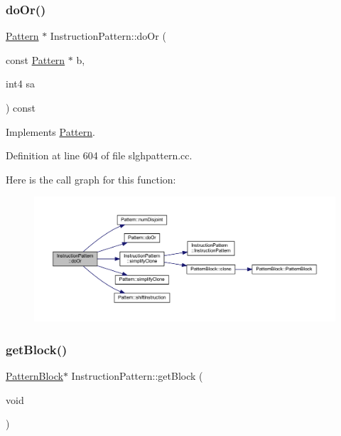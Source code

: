 \subsubsection{\texorpdfstring{doOr()}{doOr()}}
{\footnotesize\ttfamily \mbox{\hyperlink{class_pattern}{Pattern}} $\ast$ Instruction\+Pattern\+::do\+Or (\begin{DoxyParamCaption}\item[{const \mbox{\hyperlink{class_pattern}{Pattern}} $\ast$}]{b,  }\item[{int4}]{sa }\end{DoxyParamCaption}) const\hspace{0.3cm}{\ttfamily [virtual]}}



Implements \mbox{\hyperlink{class_pattern_a130c23bfea1cb4a1c6e83edf9e2503d3}{Pattern}}.



Definition at line 604 of file slghpattern.\+cc.

Here is the call graph for this function\+:
\nopagebreak
\begin{figure}[H]
\begin{center}
\leavevmode
\includegraphics[width=350pt]{class_instruction_pattern_ae44ac91ca0f01f366cdd5e89d7fe0d06_cgraph}
\end{center}
\end{figure}
\mbox{\label{class_instruction_pattern_a5edf1821ebaebb15cf835d80745e203e}} 
\subsubsection{\texorpdfstring{getBlock()}{getBlock()}}
{\footnotesize\ttfamily \mbox{\hyperlink{class_pattern_block}{Pattern\+Block}}$\ast$ Instruction\+Pattern\+::get\+Block (\begin{DoxyParamCaption}\item[{void}]{ }\end{DoxyParamCaption})\hspace{0.3cm}{\ttfamily [inline]}}



